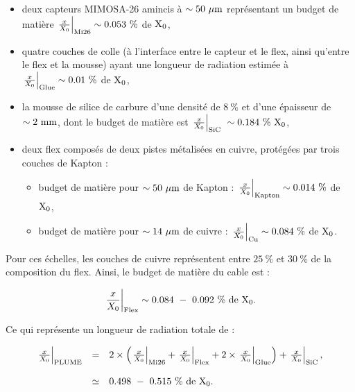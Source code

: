   \begin{itemize}
    \item deux capteurs \gls{MIMOSA}-26 amincis à $\sim 50~\rm{\mu m}$ représentant un budget de matière $\left. \frac{x}{X_0} \right|_{\rm{Mi26}} \sim 0.053~\%$ de $\rm{X_{0}}$,
    \item quatre couches de colle (à l'interface entre le capteur et le flex, ainsi qu'entre le flex et la mousse) ayant une longueur de radiation estimée à $\left. \frac{x}{X_0} \right|_{\rm{Glue}} \sim 0.01~\%$ de $\rm{X_0}$,
    \item la mousse de silice de carbure d'une densité de $8~\%$ et d'une épaisseur de $\sim 2~\rm{mm}$, dont le budget de matière est $\left. \frac{x}{X_0} \right|_{\rm{SiC}} ~\sim 0.184~\%~\rm{X_{0}}$,
    \item deux flex composés de deux pistes métalisées en cuivre, protégées par trois couches de Kapton :
    \begin{itemize}
      \item budget de matière pour $\sim 50~\rm{\mu m}$ de Kapton : $\left. \frac{x}{X_0} \right|_{\rm{Kapton}} \sim 0.014~\%$ de $\rm{X_{0}}$,
      \item budget de matière pour $\sim 14~\rm{\mu m}$ de cuivre : $\left. \frac{x}{X_0} \right|_{\rm{Cu}} \sim 0.084~\%$ de $\rm{X_{0}}$.
    \end{itemize}
  \end{itemize}

  Pour ces échelles, les couches de cuivre représentent entre $25~\%$ et $30~\%$ de la composition du flex.
  Ainsi, le budget de matière du cable est : 
  
  \begin{equation}
    \left. \frac{x}{X_0} \right|_{\rm{Flex}} \sim 0.084~-~0.092~\%~\rm{de}~\rm{X_0}.
  \end{equation}

  Ce qui représente un longueur de radiation totale de :

  \begin{equation}
    \begin{array}{lcl}
      \left. \frac{x}{X_0} \right|_{\rm{PLUME}} & = & 2 \times \left( \left. \frac{x}{X_0} \right|_{\rm{Mi26}} + \left. \frac{x}{X_0} \right|_{\rm{Flex}} + 2 \times \left. \frac{x}{X_0} \right|_{\rm{Glue}}\right) + \left. \frac{x}{X_0} \right|_{\rm{SiC}}, \\
      \\
      & \simeq & 0.498~-~0.515~\%~\rm{de}~\rm{X_0}.
    \end{array}
    \label{eq:X0theorique}
  \end{equation} 

